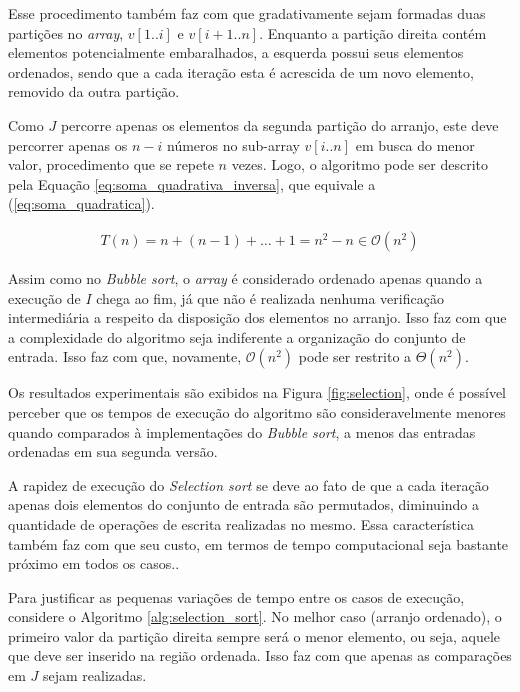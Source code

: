 \documentclass[12pt]{article}
\begin{document}
Esse procedimento também faz com que gradativamente sejam formadas duas partições no \textit{array}, $v[1..i]$ e $v[i+1..n]$. Enquanto a partição direita contém elementos potencialmente embaralhados, a esquerda possui seus elementos ordenados, sendo que a cada iteração esta é acrescida de um novo elemento, removido da outra partição.%

Como $J$ percorre apenas os elementos da segunda partição do arranjo, este deve percorrer apenas os $n-i$ números no sub-array $v[i..n]$ em busca do menor valor, procedimento que se repete $n$ vezes. Logo, o algoritmo pode ser descrito pela Equação \ref{eq:soma_quadrativa_inversa}, que equivale a (\ref{eq:soma_quadratica}).

\begin{equation}
\label{eq:soma_quadrativa_inversa}
\begin{aligned}
    T(n) = n + (n-1) + \ldots + 1 = n^2-n \in \mathcal{O}(n^2)
\end{aligned}
\end{equation}

Assim como no \textit{Bubble sort}, o \textit{array} é considerado ordenado apenas quando a execução de $I$ chega ao fim, já que não é realizada nenhuma verificação intermediária a respeito da disposição dos elementos no arranjo. Isso faz com que a complexidade do algoritmo seja indiferente a organização do conjunto de entrada. Isso faz com que, novamente, $\mathcal{O}(n^2)$ pode ser restrito a $\Theta(n^2)$.

Os resultados experimentais são exibidos na Figura \ref{fig:selection}, onde é possível perceber que os tempos de execução do algoritmo são consideravelmente menores quando comparados à implementações do \textit{Bubble sort}, a menos das entradas ordenadas em sua segunda versão.

A rapidez de execução do \textit{Selection sort} se deve ao fato de que a cada iteração apenas dois elementos do conjunto de entrada são permutados, diminuindo a quantidade de operações de escrita realizadas no mesmo. Essa característica também faz com que seu custo, em termos de tempo computacional seja bastante próximo em todos os casos..

Para justificar as pequenas variações de tempo entre os casos de execução, considere o Algoritmo \ref{alg:selection_sort}. No melhor caso (arranjo ordenado), o primeiro valor da partição direita sempre será o menor elemento, ou seja, aquele que deve ser inserido na região ordenada. Isso faz com que apenas as comparações em $J$ sejam realizadas.
\end{document}
